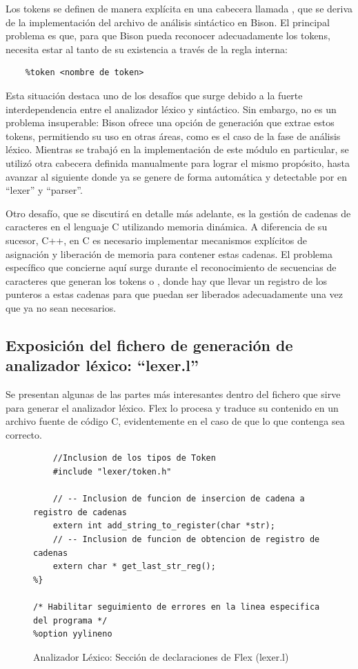Los tokens se definen de manera explícita en una cabecera llamada , que se deriva de la implementación del archivo de análisis sintáctico en Bison. El principal problema es que, para que Bison pueda reconocer adecuadamente los tokens, necesita estar al tanto de su existencia a través de la regla interna:
\begin{verbatim}
    %token <nombre de token>
\end{verbatim}

Esta situación destaca uno de los desafíos que surge debido a la fuerte interdependencia entre el analizador léxico y sintáctico. Sin embargo, no es un problema insuperable: Bison ofrece una opción de generación que extrae estos tokens, permitiendo su uso en otras áreas, como es el caso de la fase de análisis léxico. Mientras se trabajó en la implementación de este módulo en particular, se utilizó otra cabecera definida manualmente para lograr el mismo propósito, hasta avanzar al siguiente donde ya se genere de forma automática y detectable por en ``lexer'' y ``parser''.



Otro desafío, que se discutirá en detalle más adelante, es la gestión de cadenas de caracteres en el lenguaje C utilizando memoria dinámica. A diferencia de su sucesor, C++, en C es necesario implementar mecanismos explícitos de asignación y liberación de memoria para contener estas cadenas. El problema específico que concierne aquí surge durante el reconocimiento de secuencias de caracteres que generan los tokens  o , donde hay que llevar un registro de los punteros a estas cadenas para que puedan ser liberados adecuadamente una vez que ya no sean necesarios.

\subsection{Exposición del fichero de generación de analizador léxico: ``lexer.l''}
Se presentan algunas de las partes más interesantes dentro del fichero que sirve para generar el analizador léxico. Flex lo procesa y traduce su contenido en un archivo fuente de código C, evidentemente en el caso de que lo que contenga sea correcto.

\begin{figure}[ht]
\begin{lstlisting}[style=customflex]
%{
    //Inclusion de los tipos de Token
    #include "lexer/token.h"

    // -- Inclusion de funcion de insercion de cadena a registro de cadenas
    extern int add_string_to_register(char *str);
    // -- Inclusion de funcion de obtencion de registro de cadenas
    extern char * get_last_str_reg();
%}

/* Habilitar seguimiento de errores en la linea especifica del programa */
%option yylineno
\end{lstlisting}
\caption{Analizador Léxico: Sección de declaraciones de Flex (lexer.l)}
\label{fig:flexdeclarations}
\end{figure}

